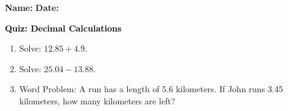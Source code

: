 \documentclass[12pt, letterpaper, fleqn]{article}
\begin{document}
\textbf{Name:} \underline{\hspace{5cm}}
\hfill
\textbf{Date:} \underline{\hspace{3cm}}\\

\begin{tcolorbox}[colback=customteal!20]
    \large\textcolor{black}{\textbf{Quiz: Decimal Calculations}}
\end{tcolorbox}
\begin{enumerate}[itemsep=3.5cm, leftmargin=0.6cm]
\item Solve: $12.85 + 4.9$.
\vspace{3.5cm}
\item Solve: $25.04 - 13.88$.
\vspace{3.5cm}
\item Word Problem: A run has a length of 5.6 kilometers. If John runs 3.45 kilometers, how many kilometers are left?
\end{enumerate}
\end{document}
